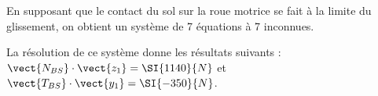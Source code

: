 En supposant que le contact du sol sur la roue motrice se fait à la limite du glissement, on obtient un système de 7 équations à 7 inconnues. 

La résolution de ce système donne les résultats suivants : $\vect{N_{BS}}\cdot \vect{z_1}=\SI{1140}{N}$ et $\vect{T_{BS}}\cdot \vect{y_1}=\SI{-350}{N}$.



\ifprof
\begin{corrige}
\end{corrige}
\else
\fi


%

%
%
%
%


